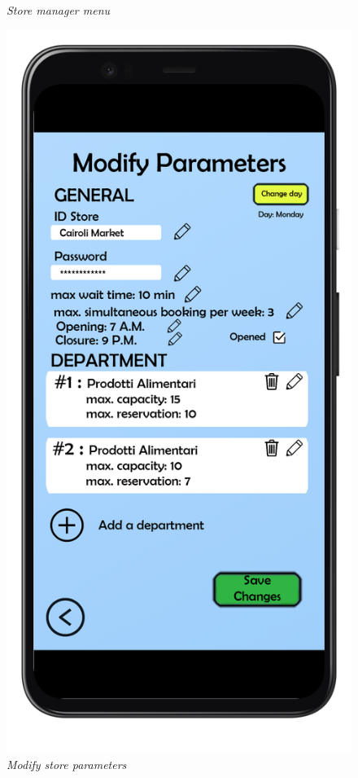 \documentclass{article}
\begin{document}
\begin{figure}[!h]
\begin{minipage}[!h]{0.4\textwidth}
			\caption{\emph{Store manager menu}}
		\end{minipage}
	\hfill
		\begin{minipage}[!h]{0.4\textwidth}
			\includegraphics[width=\textwidth]{../Mockups/ModifyParameters.png}
			\caption{\emph{Modify store parameters}}
		\end{minipage}
	\end{figure}
			
\end{document}

